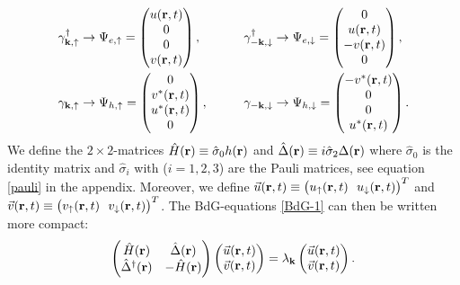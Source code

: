 \begin{equation}
\begin{aligned}
&\gamma_{\bf{k},\uparrow}^{\dagger} \rightarrow \Psi_{e,\uparrow} =
\begin{pmatrix}
    u(\mathbf{r},t) \\ 0 \\ 0 \\ v(\mathbf{r},t)    
\end{pmatrix},
\qquad
&&\gamma_{-\bf{k},\downarrow}^{\dagger} \rightarrow \Psi_{e,\downarrow}=
\begin{pmatrix}
    0 \\ u(\mathbf{r},t) \\ -v(\mathbf{r},t)\\0
\end{pmatrix},\\
&\gamma_{\bf{k},\uparrow} \rightarrow \Psi_{h,\uparrow}=
\begin{pmatrix}
    0 \\ v^*(\mathbf{r},t) \\u^*(\mathbf{r},t)\\0  
\end{pmatrix},
\qquad
&&\gamma_{-\bf{k},\downarrow} \rightarrow \Psi_{h,\downarrow}=
\begin{pmatrix}
    -v^*(\mathbf{r},t) \\ 0 \\ 0 \\ u^*(\mathbf{r},t)    
\end{pmatrix}.
\label{quasi-uv-rep}
\end{aligned}
\end{equation}
We define the $2\times 2$-matrices $\hat{H}(\mathbf{r}) \equiv \hat{\sigma}_0 h(\mathbf{r})$ and $\hat{\Delta}(\mathbf{r}) \equiv i \hat{\sigma}_2\Delta(\mathbf{r})$ where $\hat{\sigma}_0$ is the identity matrix and $\hat{\sigma}_i$ with ($i = 1,2,3$) are the Pauli matrices, see equation \eqref{pauli} in the appendix. Moreover, we define $\vec{u}(\rbf,t) \equiv \big(u_{\uparrow}(\rbf,t) \ \ u_{\downarrow}(\rbf,t)\big)^T$ and $\vec{v}(\rbf,t) \equiv \big(v_{\uparrow}(\rbf,t) \ \ v_{\downarrow}(\rbf,t)\big)^T$. The BdG-equations \eqref{BdG-1} can then be written more compact:
\begin{equation}
    \begin{pmatrix}
        \hat{H}(\mathbf{r}) & \hat{\Delta}(\mathbf{r}) \\
        \hat{\Delta}^{\dagger}(\mathbf{r}) & -\hat{H}(\mathbf{r})
    \end{pmatrix}
    \begin{pmatrix}
        \vec{u}(\mathbf{r},t) \\ \vec{v}(\mathbf{r},t)
    \end{pmatrix}
    =\lambda_{\mathbf{k}}
    \begin{pmatrix}
        \vec{u}(\mathbf{r},t) \\ \vec{v}(\mathbf{r},t)
    \end{pmatrix}.
\label{BdG-2}
\end{equation}
\\
\\


